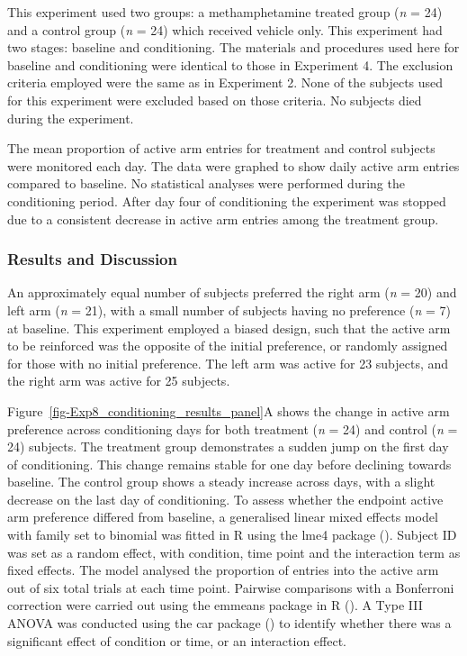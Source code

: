 \documentclass[
  jou,
  floatsintext,
  longtable,
  nolmodern,
  notxfonts,
  notimes,
  donotrepeattitle,
  colorlinks=true,linkcolor=blue,citecolor=blue,urlcolor=blue]{apa7}
\begin{document}
This experiment used two groups: a methamphetamine treated group
(\emph{n} = 24) and a control group (\emph{n} = 24) which received
vehicle only. This experiment had two stages: baseline and
conditioning.
The materials and procedures used here for baseline and conditioning
were identical to those in Experiment 4. The exclusion criteria employed
were the same as in Experiment 2. None of the subjects used for this
experiment were excluded based on those criteria. No subjects died
during the experiment.

The mean proportion of active arm entries for treatment and control
subjects were monitored each day. The data were graphed to show daily
active arm entries compared to baseline. No statistical analyses were
performed during the conditioning period. After day four of conditioning
the experiment was stopped due to a consistent decrease in active arm
entries among the treatment group.

\subsubsection{Results and Discussion}\label{results-and-discussion-3}

An approximately equal number of subjects preferred the right arm
(\emph{n} = 20) and left arm (\emph{n} = 21), with a small number of
subjects having no preference (\emph{n} = 7) at baseline. This
experiment employed a biased design, such that the active arm to be
reinforced was the opposite of the initial preference, or randomly
assigned for those with no initial preference. The left arm was active
for 23 subjects, and the right arm was active for 25 subjects.

Figure~\ref{fig-Exp8_conditioning_results_panel}A shows the change in
active arm preference across conditioning days for both treatment
(\emph{n} = 24) and control (\emph{n} = 24) subjects. The treatment
group demonstrates a sudden jump on the first day of conditioning. This
change remains stable for one day before declining towards baseline. The
control group shows a steady increase across days, with a slight
decrease on the last day of conditioning. To assess whether the endpoint
active arm preference differed from baseline, a generalised linear mixed
effects model with family set to binomial was fitted in R using the lme4
package (). Subject
ID was set as a random effect, with condition, time point and the
interaction term as fixed effects. The model analysed the proportion of
entries into the active arm out of six total trials at each time point.
Pairwise comparisons with a Bonferroni correction were carried out using
the emmeans package in R (). A Type III ANOVA was conducted using the car package
() to identify whether
there was a significant effect of condition or time, or an interaction
effect.
\end{document}
